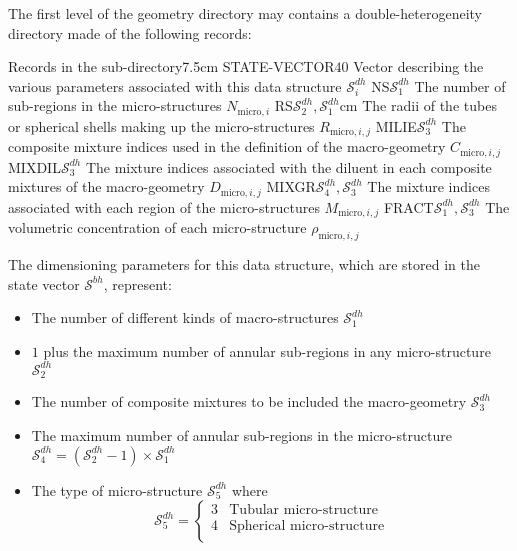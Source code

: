 The first level of the geometry directory may contains a double-heterogeneity directory  made of the
following records:

\begin{DescriptionEnregistrement}{Records in the  sub-directory}{7.5cm}
\IntEnr
  {STATE-VECTOR}{$40$}
  {Vector describing the various parameters associated with this data structure $\mathcal{S}^{dh}_{i}$}
\IntEnr
  {NS}{$\mathcal{S}^{dh}_{1}$}
  {The number of sub-regions in the micro-structures $N_{\mathrm{micro},i}$} 
\RealEnr
  {RS}{$\mathcal{S}^{dh}_{2},\mathcal{S}^{dh}_{1}$}{cm}
  {The radii of the tubes or spherical shells making up the micro-structures
   $R_{\mathrm{micro},i,j}$}
\IntEnr
  {MILIE}{$\mathcal{S}^{dh}_{3}$}
  {The composite mixture indices used in the definition of the macro-geometry $C_{\mathrm{micro},i,j}$}
\IntEnr
  {MIXDIL}{$\mathcal{S}^{dh}_{3}$}
  {The mixture indices associated with the diluent in each composite mixtures of the macro-geometry $D_{\mathrm{micro},i,j}$}
\IntEnr
  {MIXGR}{$\mathcal{S}^{dh}_{4},\mathcal{S}^{dh}_{3}$}
  {The mixture indices associated with each region of the micro-structures $M_{\mathrm{micro},i,j}$}
\RealEnr
  {FRACT}{$\mathcal{S}^{dh}_{1},\mathcal{S}^{dh}_{3}$}{}
  {The volumetric concentration of each micro-structure $\rho_{\mathrm{micro},i,j}$}
\end{DescriptionEnregistrement}

The dimensioning parameters for this data structure, which are stored in the state vector
$\mathcal{S}^{bh}$, represent:

\begin{itemize}

\item The number of different kinds of macro-structures $\mathcal{S}^{dh}_{1}$ 

\item $1$ plus the maximum number of annular sub-regions in any micro-structure
$\mathcal{S}^{dh}_{2}$ 

\item The number of composite mixtures to be included the macro-geometry $\mathcal{S}^{dh}_{3}$ 

\item The maximum number of annular sub-regions in the micro-structure 
$\mathcal{S}^{dh}_{4}=(\mathcal{S}^{dh}_{2}-1)\times \mathcal{S}^{dh}_{1}$ 

\item The type of micro-structure $\mathcal{S}^{dh}_{5}$
\noindent where
\begin{displaymath}
\mathcal{S}^{dh}_{5} = \left\{
\begin{array}{rl}
 3 & \textrm{Tubular micro-structure} \\
 4 & \textrm{Spherical micro-structure} \\
\end{array} \right.
\end{displaymath}
\end{itemize}

\clearpage
